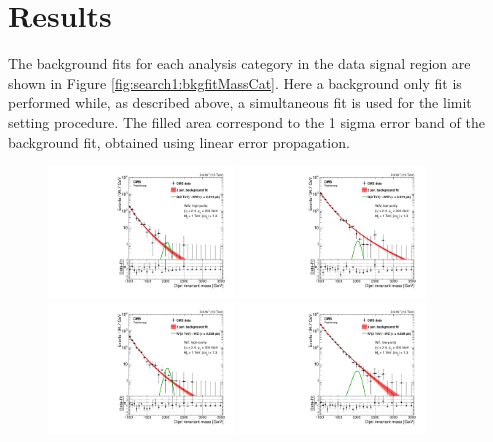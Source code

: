 \clearpage

\section{Results}
\label{sec:searchI:results}
The background fits for each analysis category in the data signal region are shown in Figure \ref{fig:search1:bkgfitMassCat}. Here a background only fit is performed while, as described above, a simultaneous fit is used for the limit setting procedure. The filled area correspond to the 1 sigma error band of the background fit, obtained using linear error propagation.

\begin{figure}[h!]
\centering
\includegraphics[width=0.44\textwidth]{figures/analysis/search1/AN-15-211/fits/MLfits/BkgFit_DijetMassHighPuriWW.pdf}
\includegraphics[width=0.44\textwidth]{figures/analysis/search1/AN-15-211/fits/MLfits/BkgFit_DijetMassLowPuriWW.pdf}\\
\includegraphics[width=0.44\textwidth]{figures/analysis/search1/AN-15-211/fits/MLfits/BkgFit_DijetMassHighPuriWZ.pdf}
\includegraphics[width=0.44\textwidth]{figures/analysis/search1/AN-15-211/fits/MLfits/BkgFit_DijetMassLowPuriWZ.pdf}\\

\end{figure}
